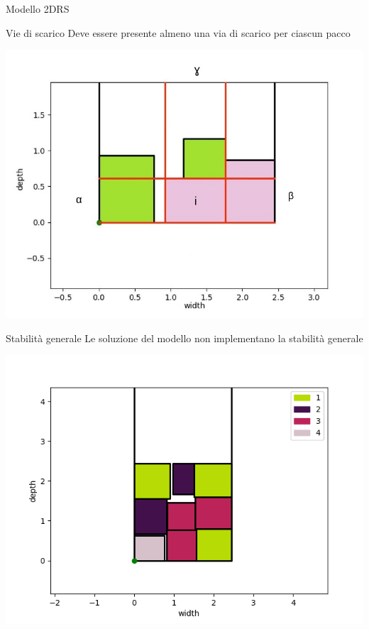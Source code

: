 \documentclass{beamer}
\begin{document}
\begin{frame}{Modello 2DRS}
												
	\begin{minipage}[c]{0.45\textwidth}
		\begin{alertblock}{Vie di scarico}
			Deve essere presente almeno una via di scarico per ciascun pacco
		\end{alertblock}	
	\end{minipage}
	\hfill
	\begin{minipage}[c]{0.45\textwidth}
		\includegraphics[width=1\linewidth]{figures/abg_2drs}
	\end{minipage}
							
	\begin{minipage}[c]{0.45\textwidth}
		\begin{alertblock}{Stabilit\`a generale}
			Le soluzione del modello non implementano la stabilit\`a generale
		\end{alertblock}	
	\end{minipage}
	\hfill
	\begin{minipage}[c]{0.45\textwidth}
		\includegraphics[width=1\linewidth]{figures/2d3d}
	\end{minipage}
\end{frame}
\end{document}
